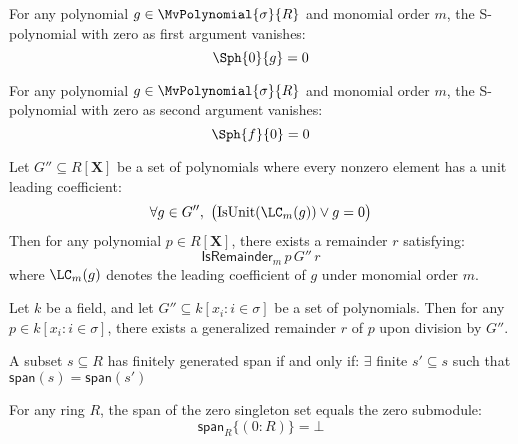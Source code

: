 \begin{lemma}\label{sPolynomial_eq_zero_of_left_eq_zero}
  \leanok
  For any polynomial $g \in \MvPolynomial{\sigma}{R}$ and monomial order $m$,
the S-polynomial with zero as first argument vanishes:
\[
\Sph{0}{g} = 0
\]
\end{lemma}

\begin{lemma}\label{sPolynomial_eq_zero_of_right_eq_zero'}
  \leanok
  For any polynomial $g \in \MvPolynomial{\sigma}{R}$ and monomial order $m$,
the S-polynomial with zero as second argument vanishes:
\[
\Sph{f}{0} = 0
\]
\end{lemma}

\begin{lemma}\label{div_set'}
  \leanok
  Let $G'' \subseteq R[\mathbf{X}]$ be a set of polynomials where every nonzero element has a unit leading coefficient:
\[
\forall g \in G'',\ \big(\mathrm{IsUnit}(\LC_m(g)) \lor g = 0\big)
\]
Then for any polynomial $p \in R[\mathbf{X}]$, there exists a remainder $r$ satisfying:
\[
\mathsf{IsRemainder}_m\,p\,G''\,r
\]
where $\LC_m(g)$ denotes the leading coefficient of $g$ under monomial order $m$.
\end{lemma}

\begin{lemma}\label{div_set''}
  \leanok
  Let \( k \) be a field, and let \( G'' \subseteq k[x_i : i \in \sigma] \) be a set of polynomials.
Then for any \( p \in k[x_i : i \in \sigma] \), there exists a generalized remainder \( r \) of \( p \) upon division by \( G'' \).

\end{lemma}

\begin{lemma}\label{fg_span_iff_fg_span_finset_subset}


  A subset $s \subseteq R$ has finitely generated span if and only if:
$\exists$ finite $s' \subseteq s$ such that $\mathsf{span}(s) = \mathsf{span}(s')$

\end{lemma}

\begin{lemma}\label{span_singleton_zero}

  \leanok
  For any ring \( R \), the span of the zero singleton set equals the zero submodule:
\[
\mathsf{span}_R \{(0 : R)\} = \bot
\]

\end{lemma}

